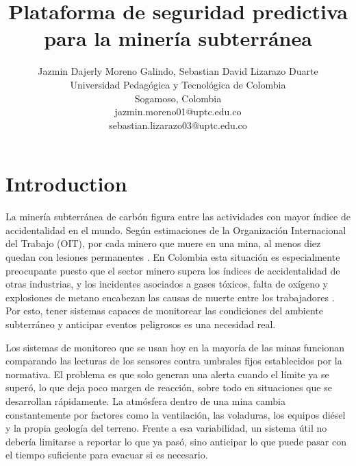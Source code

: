 \documentclass[journal,onecolumn]{IEEEtran}
\begin{document}
\title{Plataforma de seguridad predictiva para la minería subterránea}


\author{Jazmin Dajerly Moreno Galindo, Sebastian David Lizarazo Duarte\\
Universidad Pedagógica y Tecnológica de Colombia \\
Sogamoso, Colombia \\
jazmin.moreno01@uptc.edu.co\\
sebastian.lizarazo03@uptc.edu.co}


\maketitle

\begin{abstract}


\end{abstract}

\begin{IEEEkeywords}

\end{IEEEkeywords}

\IEEEpeerreviewmaketitle



\section{Introduction}
La minería subterránea de carbón figura entre las actividades con mayor índice de accidentalidad en el mundo. Según estimaciones de la Organización Internacional del Trabajo (OIT), por cada minero que muere en una mina, al menos diez quedan con lesiones permanentes \cite{ilo2022}. En Colombia esta situación es especialmente preocupante puesto que el sector minero supera los índices de accidentalidad de otras industrias, y los incidentes asociados a gases tóxicos, falta de oxígeno y explosiones de metano encabezan las causas de muerte entre los trabajadores \cite{decreto1886}. Por esto, tener sistemas capaces de monitorear las condiciones del ambiente subterráneo y anticipar eventos peligrosos es una necesidad real.

Los sistemas de monitoreo que se usan hoy en la mayoría de las minas funcionan comparando las lecturas de los sensores contra umbrales fijos establecidos por la normativa. El problema es que solo generan una alerta cuando el límite ya se superó, lo que deja poco margen de reacción, sobre todo en situaciones que se desarrollan rápidamente. La atmósfera dentro de una mina cambia constantemente por factores como la ventilación, las voladuras, los equipos diésel y la propia geología del terreno. Frente a esa variabilidad, un sistema útil no debería limitarse a reportar lo que ya pasó, sino anticipar lo que puede pasar con el tiempo suficiente para evacuar si es necesario.
\end{document}
